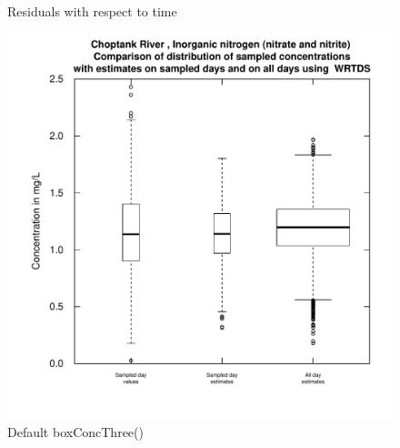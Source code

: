 \documentclass[a4paper,11pt]{article}\usepackage{graphicx, color}
\newenvironment{knitrout}{}{} %
\begin{document}
\begin{knitrout}
\color{fgcolor}\begin{figure}[]
\caption[Residuals with respect to time]{Residuals with respect to time\label{fig:boxResidMonth}}
\end{figure}


\end{knitrout}


\begin{knitrout}
\color{fgcolor}\begin{figure}[]

\includegraphics[width=.5\linewidth,height=.5\linewidth]{figure/boxConcThree} \caption[Default boxConcThree()]{Default boxConcThree()\label{fig:boxConcThree}}
\end{figure}


\end{knitrout}
\end{document}

